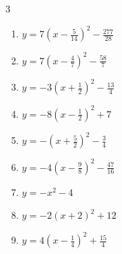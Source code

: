 \begin{multicols}{3}
\begin{enumerate}

  \item $\displaystyle y=7\left( x-\frac{5}{14}\right)^{2}-\frac{277}{28}$


  \item $\displaystyle y=7\left( x-\frac{4}{7}\right)^{2}-\frac{58}{7}$


\columnbreak %

\resetques

  \item $\displaystyle y=-3\left( x+\frac{1}{2}\right)^{2}-\frac{13}{4}$


  \item $\displaystyle y=-8\left( x-\frac{1}{2}\right)^{2}+7$


  \item $\displaystyle y=-\left( x+\frac{5}{2}\right)^{2}-\frac{3}{4}$


  \item $\displaystyle y=-4\left( x-\frac{9}{8}\right)^{2}-\frac{47}{16}$


  \item $\displaystyle y=-x^{2}-4$

        \phantom{$\displaystyle 頂点\left( 0 , -4 \right)$}

  \item $\displaystyle y=-2\left( x+2\right)^{2}+12$

        \phantom{$\displaystyle 頂点\left( -2 , 12 \right)$}

  \item $\displaystyle y=4\left( x-\frac{1}{4}\right)^{2}+\frac{15}{4}$



\end{enumerate}
\end{multicols}
